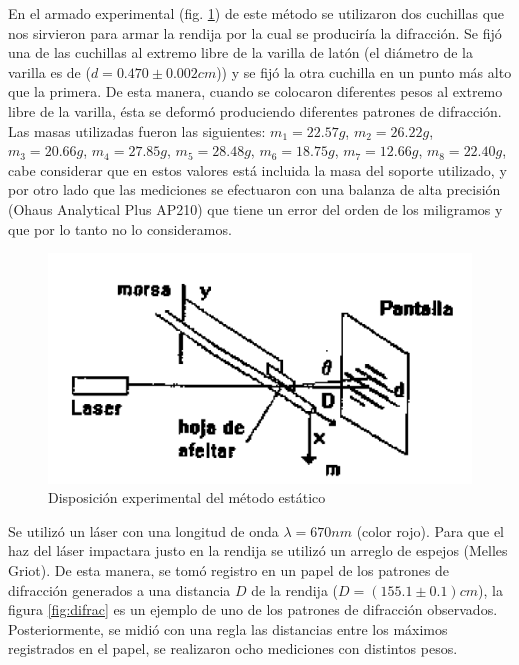 \documentclass[twoside,twocolumn,a4paper]{article}
\begin{document}
En el armado experimental (fig. \ref{fig:disenoestatico}) de este m\'etodo se utilizaron dos cuchillas que nos sirvieron para armar la rendija por la cual se producir\'ia la difracci\'on. Se fij\'o una de las cuchillas al extremo libre de la varilla de lat\'on (el di\'ametro de la varilla es de ($d=0.470\pm0.002cm$)) y se fij\'o la otra cuchilla en un punto m\'as alto que la primera. De esta manera, cuando se colocaron diferentes pesos al extremo libre de la varilla, \'esta se deform\'o produciendo diferentes patrones de difracci\'on. Las masas utilizadas fueron las siguientes: $m_{1}=22.57g$,  $m_{2}=26.22g$, $m_{3}=20.66g$, $m_{4}=27.85g$, $m_{5}=28.48g$, $m_{6}=18.75g$, $m_{7}=12.66g$, $m_{8}=22.40g$, cabe considerar que en estos valores est\'a incluida la masa del soporte utilizado, y por otro lado que las mediciones se efectuaron con una balanza de alta precisi\'on (Ohaus Analytical Plus AP210) que tiene un error del orden de los miligramos y que por lo tanto no lo consideramos. \newline

\begin{figure}[H]
\includegraphics[width=\linewidth]{disenoestatico.png}
\caption{Disposici\'on experimental del m\'etodo est\'atico}
\label{fig:disenoestatico}
\end{figure}

Se utiliz\'o un l\'aser con una longitud de onda $\lambda= 670nm $ (color rojo). Para que el haz del l\'aser impactara justo en la rendija se utiliz\'o un arreglo de espejos (Melles Griot). De esta manera, se tom\'o registro en un papel de los patrones de difracci\'on generados a una distancia $D$ de la rendija ($D=(155.1\pm0.1)cm$), la figura \ref{fig:difrac} es un ejemplo de uno de los patrones de difracci\'on observados. Posteriormente, se midi\'o con una regla las distancias entre los m\'aximos registrados en el papel, se realizaron ocho mediciones con distintos pesos.
\end{document}
